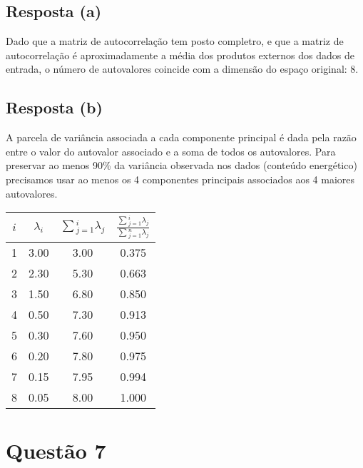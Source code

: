 \documentclass[final,3p]{elsarticle}
\numberwithin{equation}{section}
\begin{document}
    \subsection{Resposta \textbf{(a)}}

        Dado que a matriz de autocorrelação tem posto completro, e que a matriz de autocorrelação é aproximadamente a média dos produtos externos dos dados de entrada, o número de autovalores coincide com a dimensão do espaço original: 8.

    \subsection{Resposta \textbf{(b)}}

        A parcela de variância associada a cada componente principal é dada pela razão entre o valor do autovalor associado e a soma de todos os autovalores. Para preservar ao menos 90\% da variância observada nos dados (conteúdo energético) precisamos usar ao menos os 4 componentes principais associados aos 4 maiores autovalores.

        \begin{table}[H]
            \centering
            \begin{tabular}{c c c c}
                \toprule
                \textbf{$i$} & \textbf{$\lambda{}_i$} & \textbf{$\sum{}_{j=1}^i\lambda{}_j$} & \textbf{$\frac{\sum{}_{j=1}^i\lambda{}_j}{\sum{}_{j=1}^n\lambda{}_j}$} \\
                \midrule
                1 & 3.00 & 3.00 & 0.375 \\
                2 & 2.30 & 5.30 & 0.663 \\
                3 & 1.50 & 6.80 & 0.850 \\
                4 & 0.50 & 7.30 & 0.913 \\
                5 & 0.30 & 7.60 & 0.950 \\
                6 & 0.20 & 7.80 & 0.975 \\
                7 & 0.15 & 7.95 & 0.994 \\
                8 & 0.05 & 8.00 & 1.000 \\
                \bottomrule
            \end{tabular}
        \end{table}


\section{Questão 7}
\end{document}
